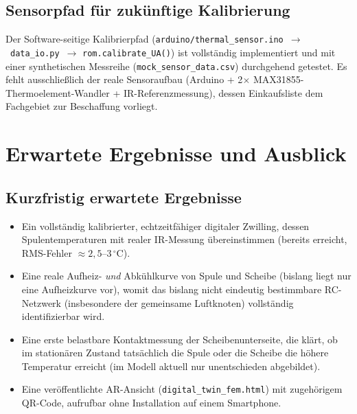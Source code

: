 \documentclass[a4paper,11pt]{article}
\begin{document}
\subsection{Sensorpfad für zukünftige Kalibrierung}
Der Software-seitige Kalibrierpfad
(\texttt{arduino/thermal\_sensor.ino}~$\to$~\texttt{data\_io.py}~$\to$
\texttt{rom.calibrate\_UA()}) ist vollständig implementiert und mit einer
synthetischen Messreihe (\texttt{mock\_sensor\_data.csv}) durchgehend
getestet. Es fehlt ausschließlich der reale Sensoraufbau (Arduino +
2$\times$ MAX31855-Thermoelement-Wandler + IR-Referenzmessung), dessen
Einkaufsliste dem Fachgebiet zur Beschaffung vorliegt.

\section{Erwartete Ergebnisse und Ausblick}

\subsection{Kurzfristig erwartete Ergebnisse}
\begin{itemize}[nosep]
  \item Ein vollständig kalibrierter, echtzeitfähiger digitaler Zwilling,
        dessen Spulentemperaturen mit realer IR-Messung übereinstimmen
        (bereits erreicht, RMS-Fehler $\approx 2{,}5$--$3\,^\circ$C).
  \item Eine reale Aufheiz- \emph{und} Abkühlkurve von Spule und Scheibe
        (bislang liegt nur eine Aufheizkurve vor), womit das bislang nicht
        eindeutig bestimmbare RC-Netzwerk (insbesondere der gemeinsame
        Luftknoten) vollständig identifizierbar wird.
  \item Eine erste belastbare Kontaktmessung der Scheibenunterseite, die
        klärt, ob im stationären Zustand tatsächlich die Spule oder die
        Scheibe die höhere Temperatur erreicht (im Modell aktuell nur
        unentschieden abgebildet).
  \item Eine veröffentlichte AR-Ansicht (\texttt{digital\_twin\_fem.html})
        mit zugehörigem QR-Code, aufrufbar ohne Installation auf einem
        Smartphone.
\end{itemize}
\end{document}

